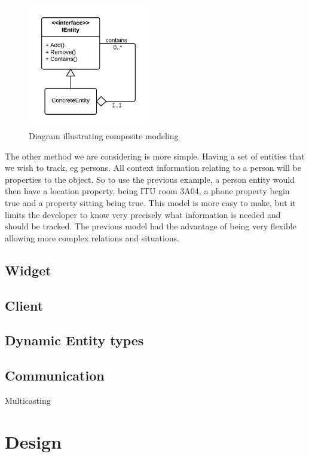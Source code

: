 \documentclass[]{report}
\begin{document}
\begin{figure}[H]
\centering
\includegraphics[width=200px]{composite.png}
\caption{Diagram illustrating composite modeling}
\label{fig:composite}
\end{figure}


The other method we are considering is more simple. Having a set of entities that we wish to track, eg persons. All context information relating to a person will be properties to the object. So to use the previous example, a person entity would then have a location property, being ITU room 3A04, a phone property begin true and a property sitting being true. This model is more easy to make, but it limits the developer to know very precisely what information is needed and should be tracked. The previous model had the advantage of being very flexible allowing more complex relations and situations. 



\section{Widget}

\section{Client}


\section{Dynamic Entity types}


\section{Communication}

Multicasting




\chapter{Design}
\end{document}
